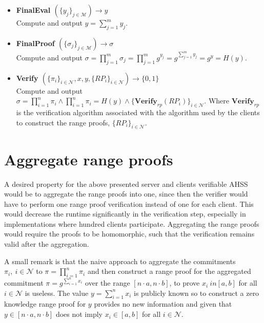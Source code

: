 \begin{algorithm}
\begin{itemize}
\item\textbf{FinalEval $(\{y_j\}_{j\in\mathcal{M}})\xrightarrow[]{}y$}\\
Compute and output $y = \sum_{j=1}^m y_{j}$.

\item\textbf{FinalProof $(\{\sigma_j\}_{j\in\mathcal{M}})\xrightarrow[]{}\sigma$}\\
Compute and output $\sigma = \prod_{j=1}^m \sigma_j = \prod_{j=1}^m g^{y_{j}} =  g^{\sum_{j=1}^m y_{j}}= g^{y}=H(y)$.

\item\textbf{Verify $(\{\pi_i\}_{i\in\mathcal{N}},x,y,\{RP_i\}_{i\in\mathcal{N}})\xrightarrow[]{}\{0,1\}$}\\
Compute and output $\sigma= \prod_{i=1}^n \pi_i \wedge \prod_{i=1}^n \pi_i = H(y)\wedge \{\textbf{Verify}_{rp}(RP_i)\}_{i\in\mathcal{N}}$. Where $\textbf{Verify}_{rp}$ is the verification algorithm associated with the algorithm used by the clients to construct the range proofs, $\{RP_i\}_{i\in\mathcal{N}}$.
\end{itemize}
\label{alg:VAHSS-HSS-RP}
\end{algorithm}
\section{Aggregate range proofs}
A desired property for the above presented server and clients verifiable AHSS would be to aggregate the range proofs into one, since then the verifier would have to perform one range proof verification instead of one for each client. This would decrease the runtime significantly in the verification step, especially in implementations where hundred clients participate. Aggregating the range proofs would require the proofs to be homomorphic, such that the verification remains valid after the aggregation. 

A small remark is that the naive approach to aggregate the commitments $\pi_i, \: i\in\mathcal{N}$ to $\pi = \prod_{i=1}^n \pi_i$ and then construct a range proof for the aggregated commitment $\pi = g^{\sum_{i=1}^n x_i}$ over the range $[n\cdot a,n\cdot b]$, to prove $x_i\ in [a,b]$ for all $i \in\mathcal{N}$  is useless. The value $y=\sum_{i=1}^n x_i$ is publicly known so to construct a zero knowledge range proof for $y $ provides no new information and given that $y\in [n\cdot a,n\cdot b]$ does not imply $x_i\in [a,b]$ for all $i\in\mathcal{N}$. 

